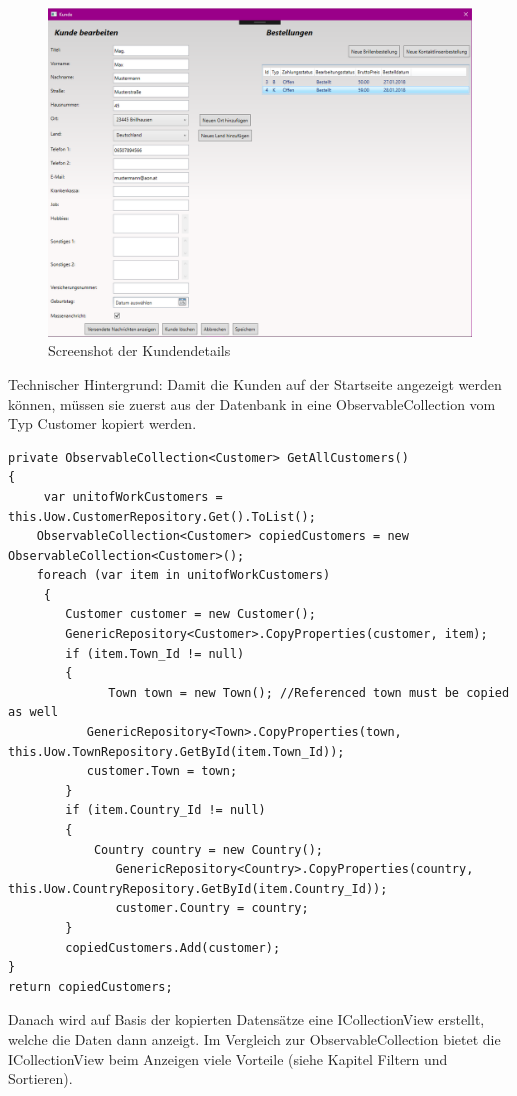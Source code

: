 \begin{figure}[H]
\begin{center}
	\includegraphics[scale=.25]{images/KundenDetails.png}
\end{center}
	\caption{Screenshot der Kundendetails}
	\label{fig:sample}
\end{figure}
Technischer Hintergrund:
Damit die Kunden auf der Startseite angezeigt werden können, müssen sie zuerst aus der Datenbank in eine ObservableCollection vom Typ Customer kopiert werden.
\begin{lstlisting}
private ObservableCollection<Customer> GetAllCustomers()
{
	 var unitofWorkCustomers = this.Uow.CustomerRepository.Get().ToList();
    ObservableCollection<Customer> copiedCustomers = new ObservableCollection<Customer>();
    foreach (var item in unitofWorkCustomers)
  	 {
        Customer customer = new Customer();
        GenericRepository<Customer>.CopyProperties(customer, item);
        if (item.Town_Id != null)
        {
        	  Town town = new Town(); //Referenced town must be copied as well
           GenericRepository<Town>.CopyProperties(town, this.Uow.TownRepository.GetById(item.Town_Id));
           customer.Town = town;
        }
        if (item.Country_Id != null)
        {
         	Country country = new Country();
        	   GenericRepository<Country>.CopyProperties(country, this.Uow.CountryRepository.GetById(item.Country_Id));
        	   customer.Country = country;
        }
        copiedCustomers.Add(customer);
}
return copiedCustomers;
\end{lstlisting}
Danach wird auf Basis der kopierten Datensätze eine ICollectionView erstellt, welche die Daten dann anzeigt. Im Vergleich zur ObservableCollection bietet die ICollectionView beim Anzeigen viele Vorteile (siehe Kapitel Filtern und Sortieren). 
